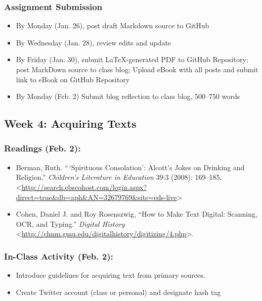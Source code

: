 \documentclass[]{article}
\begin{document}
\subsubsection{Assignment Submission}\label{assignment-submission}

\begin{itemize}
\itemsep1pt\parskip0pt
\item
  By Monday (Jan. 26), post draft Markdown source to GitHub
\item
  By Wednesday (Jan. 28), review edits and update
\item
  By Friday (Jan. 30), submit LaTeX-generated PDF to GitHub Repository;
  post MarkDown source to class blog; Upload eBook with all posts and
  submit link to eBook on GitHub Repository
\item
  By Monday (Feb. 2) Submit blog reflection to class blog, 500--750
  words
\end{itemize}

\subsection{Week 4: Acquiring Texts}\label{week-4-acquiring-texts}

\subsubsection{Readings (Feb. 2):}\label{readings-feb.-2}

\begin{itemize}
\itemsep1pt\parskip0pt
\item
  Berman, Ruth. ``\,`Spirituous Consolation': Alcott's Jokes on Drinking
  and Religion.'' \emph{Children's Literature in Education} 39:3 (2008):
  169--185.
  \textless{}\url{http://search.ebscohost.com/login.aspx?direct=true\&db=aph\&AN=32679769\&site=eds-live}\textgreater{}
\item
  Cohen, Daniel J. and Roy Rosenszwig, ``How to Make Text Digital:
  Scanning, OCR, and Typing.'' \emph{Digital History}
  \textless{}\url{http://chnm.gmu.edu/digitalhistory/digitizing/4.php}\textgreater{}.
\end{itemize}

\subsubsection{In-Class Activity (Feb.
2):}\label{in-class-activity-feb.-2}

\begin{itemize}
\itemsep1pt\parskip0pt
\item
  Introduce guidelines for acquiring text from primary sources.
\item
  Create Twitter account (class or personal) and designate hash tag
\end{itemize}
\end{document}
